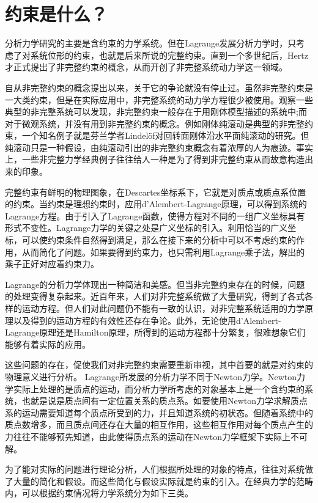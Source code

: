 \documentclass[A4,twoside]{ctexart}
\begin{document}
\section{约束是什么？}
\label{sec:constraint}


分析力学研究的主要是含约束的力学系统。但在Lagrange发展分析力学时，只考虑了对系统位形的约束，也就是后来所说的完整约束。直到一个多世纪后，Hertz才正式提出了非完整约束的概念，从而开创了非完整系统动力学这一领域。

自从非完整约束的概念提出以来，关于它的争论就没有停止过。虽然非完整约束是一大类约束，但是在实际应用中，非完整系统的动力学方程很少被使用。观察一些典型的非完整系统可以发现，非完整约束一般存在于用刚体模型描述的系统中;而对于微观系统，并没有用到非完整约束的概念。例如刚体纯滚动是典型的非完整约束，一个知名例子就是芬兰学者Lindel\"of对回转面刚体沿水平面纯滚动的研究。但纯滚动只是一种假设，由纯滚动引出的非完整约束概念有着浓厚的人为痕迹。事实上，一些非完整力学经典例子往往给人一种是为了得到非完整约束从而故意构造出来的印象\supercite{2}。

完整约束有鲜明的物理图象，在Descartes坐标系下，它就是对质点或质点系位置的约束。当约束是理想约束时，应用d'Alembert-Lagrange原理，可以得到系统的Lagrange方程。由于引入了Lagrange函数，使得方程对不同的一组广义坐标具有形式不变性。Lagrange力学的关键之处是广义坐标的引入。利用恰当的广义坐标，可以使约束条件自然得到满足，那么在接下来的分析中可以不考虑约束的作用，从而简化了问题。如果要得到约束力，也只需利用Lagrange乘子法，解出的乘子正好对应着约束力。

Lagrange的分析力学体现出一种简洁和美感。但当非完整约束存在的时候，问题的处理变得复杂起来。近百年来，人们对非完整系统做了大量研究，得到了各式各样的运动方程。但人们对此问题仍不能有一致的认识，对非完整系统适用的力学原理以及得到的运动方程的有效性还存在争论。此外，无论使用d'Alembert-Lagrange原理还是Hamilton原理，所得到的运动方程都十分繁复，很难想象它们能够有着实际的应用。

这些问题的存在，促使我们对非完整约束需要重新审视，其中首要的就是对约束的物理意义进行分析。
Lagrange所发展的分析力学不同于Newton力学。Newton力学实际上处理的是质点的运动，而分析力学所考虑的对象基本上是一个含约束的系统，也就是说是质点间有一定位置关系的质点系。如要使用Newton力学求解质点系的运动需要知道每个质点所受到的力，并且知道系统的初状态。但随着系统中的质点数增多，而且质点间还存在大量的相互作用，这些相互作用对每个质点产生的力往往不能够预先知道，由此使得质点系的运动在Newton力学框架下实际上不可解。

为了能对实际的问题进行理论分析，人们根据所处理的对象的特点，往往对系统做了大量的简化和假设。而这些简化与假设实际就是约束的引入。在经典力学的范畴内，可以根据约束情况将力学系统分为如下三类。
\end{document}
